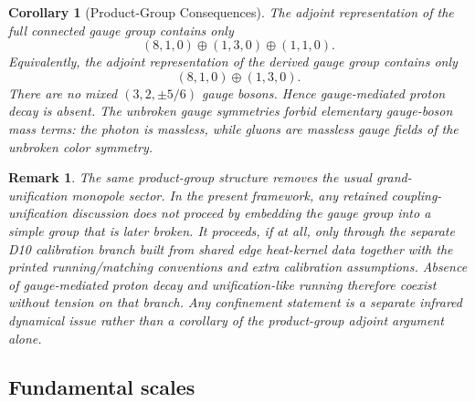 \documentclass[11pt]{article}
\newtheorem{corollary}[theorem]{Corollary}
\newtheorem{remark}[theorem]{Remark}
\begin{document}
\begin{corollary}[Product-Group Consequences]
The adjoint representation of the full connected gauge group contains only
\[
(8,1,0)\oplus(1,3,0)\oplus(1,1,0).
\]
Equivalently, the adjoint representation of the derived gauge group contains only
\[
(8,1,0)\oplus(1,3,0).
\]
There are no mixed $(3,2,\pm 5/6)$ gauge bosons. Hence gauge-mediated proton decay is absent. The unbroken gauge symmetries forbid elementary gauge-boson mass terms: the photon is massless, while gluons are massless gauge fields of the unbroken color symmetry.
\end{corollary}

\begin{remark}
The same product-group structure removes the usual grand-unification monopole sector. In the present framework, any retained coupling-unification discussion does not proceed by embedding the gauge group into a simple group that is later broken. It proceeds, if at all, only through the separate D10 calibration branch built from shared edge heat-kernel data together with the printed running/matching conventions and extra calibration assumptions. Absence of gauge-mediated proton decay and unification-like running therefore coexist without tension on that branch. Any confinement statement is a separate infrared dynamical issue rather than a corollary of the product-group adjoint argument alone.
\end{remark}

\subsection{Fundamental scales}
\end{document}
